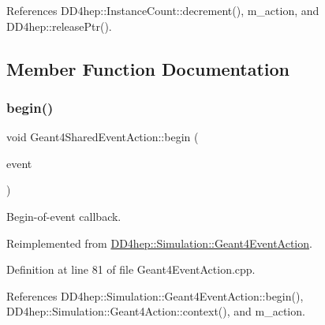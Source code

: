 References D\+D4hep\+::\+Instance\+Count\+::decrement(), m\+\_\+action, and D\+D4hep\+::release\+Ptr().



\subsection{Member Function Documentation}
\hypertarget{class_d_d4hep_1_1_simulation_1_1_geant4_shared_event_action_a64b5998713b09c32de56774b1d69f64d}{}\label{class_d_d4hep_1_1_simulation_1_1_geant4_shared_event_action_a64b5998713b09c32de56774b1d69f64d} 
\subsubsection{\texorpdfstring{begin()}{begin()}}
{\footnotesize\ttfamily void Geant4\+Shared\+Event\+Action\+::begin (\begin{DoxyParamCaption}\item[{const G4\+Event $\ast$}]{event }\end{DoxyParamCaption})\hspace{0.3cm}{\ttfamily [virtual]}}



Begin-\/of-\/event callback. 



Reimplemented from \hyperlink{class_d_d4hep_1_1_simulation_1_1_geant4_event_action_ad10785d157fa962f4ef2a5361bb0f5da}{D\+D4hep\+::\+Simulation\+::\+Geant4\+Event\+Action}.



Definition at line 81 of file Geant4\+Event\+Action.\+cpp.



References D\+D4hep\+::\+Simulation\+::\+Geant4\+Event\+Action\+::begin(), D\+D4hep\+::\+Simulation\+::\+Geant4\+Action\+::context(), and m\+\_\+action.

\hypertarget{class_d_d4hep_1_1_simulation_1_1_geant4_shared_event_action_a7933d545b7caacaca3928b3af1038df6}{}\label{class_d_d4hep_1_1_simulation_1_1_geant4_shared_event_action_a7933d545b7caacaca3928b3af1038df6} 
